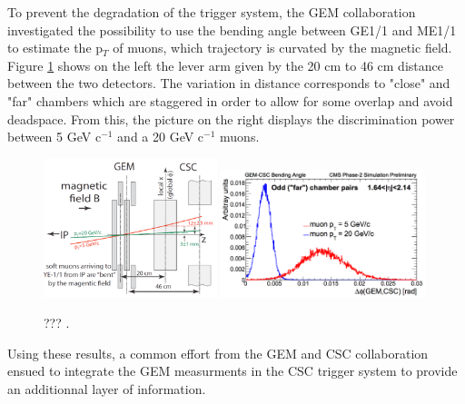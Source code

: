     To prevent the degradation of the trigger system, the GEM collaboration investigated the possibility to use the bending angle between GE1/1 and ME1/1 to estimate the p$_T$ of muons, which trajectory is curvated by the magnetic field. Figure \ref{fig:II-1-gem-csc-bending} shows on the left the lever arm given by the 20 cm to 46 cm distance between the two detectors. The variation in distance corresponds to "close" and "far" chambers which are staggered in order to allow for some overlap and avoid deadspace. From this, the picture on the right displays the discrimination power between 5 GeV c$^{-1}$ and a 20 GeV c$^{-1}$ muons. \\

    \begin{figure}[h!]
      \centering
      \includegraphics[width=0.45\textwidth]{img/II-1-gem/gem-csc-bending-1.png}
      \includegraphics[width=0.53\textwidth]{img/II-1-gem/gem-csc-bending-2.png}
      \caption{??? \cite{Colaleo:2021453}.}
      \label{fig:II-1-gem-csc-bending}
    \end{figure}

    Using these results, a common effort from the GEM and CSC collaboration ensued to integrate the GEM measurments in the CSC trigger system to provide an additionnal layer of information. 

